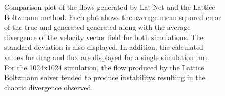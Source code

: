 \documentclass{article}
\begin{document}
\begin{figure}[!t]
\caption{ Comparison plot of the flows generated by Lat-Net and the Lattice Boltzmann method. Each plot shows the average mean squared error of the true and generated generated along with the average divergence of the velocity vector field for both simulations. The standard deviation is also displayed. In addition, the calculated values for drag and flux are displayed for a single simulation run. For the 1024x1024 simulation, the flow produced by the Lattice Boltzmann solver tended to produce instabilitys resulting in the chaotic divergence observed.}
\label{2d_error_plot}
\end{figure}
\end{document}
